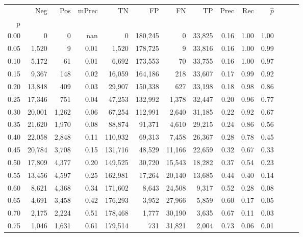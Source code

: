 \begin{tabular}{rrrrrrrrrrrrrr}
\toprule
{} &     Neg &    Pos & mPrec &       TN &       FP &      FN &      TP &  Prec &   Rec & $\hat{p}$ \\
p    &         &        &       &          &          &         &         &       &       &           \\
\midrule
0.00 &       0 &      0 &   nan &        0 &  180,245 &       0 &  33,825 &  0.16 &  1.00 &      1.00 \\
0.05 &   1,520 &      9 &  0.01 &    1,520 &  178,725 &       9 &  33,816 &  0.16 &  1.00 &      0.99 \\
0.10 &   5,172 &     61 &  0.01 &    6,692 &  173,553 &      70 &  33,755 &  0.16 &  1.00 &      0.97 \\
0.15 &   9,367 &    148 &  0.02 &   16,059 &  164,186 &     218 &  33,607 &  0.17 &  0.99 &      0.92 \\
0.20 &  13,848 &    409 &  0.03 &   29,907 &  150,338 &     627 &  33,198 &  0.18 &  0.98 &      0.86 \\
0.25 &  17,346 &    751 &  0.04 &   47,253 &  132,992 &   1,378 &  32,447 &  0.20 &  0.96 &      0.77 \\
0.30 &  20,001 &  1,262 &  0.06 &   67,254 &  112,991 &   2,640 &  31,185 &  0.22 &  0.92 &      0.67 \\
0.35 &  21,620 &  1,970 &  0.08 &   88,874 &   91,371 &   4,610 &  29,215 &  0.24 &  0.86 &      0.56 \\
0.40 &  22,058 &  2,848 &  0.11 &  110,932 &   69,313 &   7,458 &  26,367 &  0.28 &  0.78 &      0.45 \\
0.45 &  20,784 &  3,708 &  0.15 &  131,716 &   48,529 &  11,166 &  22,659 &  0.32 &  0.67 &      0.33 \\
0.50 &  17,809 &  4,377 &  0.20 &  149,525 &   30,720 &  15,543 &  18,282 &  0.37 &  0.54 &      0.23 \\
0.55 &  13,456 &  4,597 &  0.25 &  162,981 &   17,264 &  20,140 &  13,685 &  0.44 &  0.40 &      0.14 \\
0.60 &   8,621 &  4,368 &  0.34 &  171,602 &    8,643 &  24,508 &   9,317 &  0.52 &  0.28 &      0.08 \\
0.65 &   4,691 &  3,458 &  0.42 &  176,293 &    3,952 &  27,966 &   5,859 &  0.60 &  0.17 &      0.05 \\
0.70 &   2,175 &  2,224 &  0.51 &  178,468 &    1,777 &  30,190 &   3,635 &  0.67 &  0.11 &      0.03 \\
0.75 &   1,046 &  1,631 &  0.61 &  179,514 &      731 &  31,821 &   2,004 &  0.73 &  0.06 &      0.01 \\

\end{tabular}
